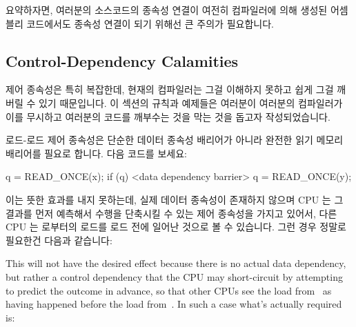 요약하자면, 여러분의 소스코드의 종속성 연결이 여전히 컴파일러에 의해 생성된
어셈블리 코드에서도 종속성 연결이 되기 위해선 큰 주의가 필요합니다.

\subsection{Control-Dependency Calamities}
\label{sec:memorder:Control-Dependency Calamities}

제어 종속성은 특히 복잡한데, 현재의 컴파일러는 그걸 이해하지 못하고 쉽게 그걸
깨버릴 수 있기 때문입니다.
이 섹션의 규칙과 예제들은 여러분이 여러분의 컴파일러가 이를 무시하고 여러분의
코드를 깨부수는 것을 막는 것을 돕고자 작성되었습니다.

로드-로드 제어 종속성은 단순한 데이터 종속성 배리어가 아니라 완전한 읽기 메모리
배리어를 필요로 합니다.
다음 코드를 보세요:

\begin{VerbatimN}
q = READ_ONCE(x);
if (q) {
	<data dependency barrier>
	q = READ_ONCE(y);
}
\end{VerbatimN}

이는 뜻한 효과를 내지 못하는데, 실제 데이터 종속성이 존재하지 않으며 CPU 는 그
결과를 먼저 예측해서 수행을 단축시킬 수 있는 제어 종속성을 가지고 있어서, 다른
CPU 는  로부터의 로드를  로드 전에 일어난 것으로 볼 수 있습니다.
그런 경우 정말로 필요한건 다음과 같습니다:

\iffalse

This will not have the desired effect because there is no actual data
dependency, but rather a control dependency that the CPU may short-circuit
by attempting to predict the outcome in advance, so that other CPUs see
the load from~ as having happened before the load from~.
In such a case what's actually required is:

